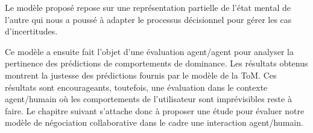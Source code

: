 	Le modèle proposé repose sur une représentation partielle de l'état mental de l'autre qui nous a poussé à adapter le processus décisionnel pour gérer les cas d'incertitudes. 
	
	Ce modèle a ensuite fait l'objet d'une évaluation agent/agent pour analyser la pertinence des prédictions de comportements de dominance. Les résultats obtenus montrent la justesse des prédictions fournis par le modèle de la ToM. Ces résultats sont encourageants, toutefois, une évaluation dans le contexte agent/humain où les comportements de l'utilisateur sont imprévisibles reste à faire. Le chapitre suivant s'attache donc à proposer une étude pour évaluer notre modèle de négociation collaborative dans le cadre une interaction agent/humain.
	
	